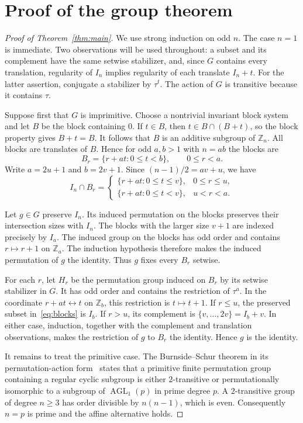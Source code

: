 \documentclass[11pt]{article}
\newcommand{\Z}{\mathbb Z}
\newcommand{\AGL}{\operatorname{AGL}}
\begin{document}
\section{Proof of the group theorem}
\begin{proof}[Proof of Theorem~\ref{thm:main}]
We use strong induction on odd $n$. The case $n=1$ is immediate.
Two observations will be used throughout: a subset and its complement
have the same setwise stabilizer, and, since $G$ contains every
translation, regularity of $I_n$ implies regularity of each translate
$I_n+t$. For the latter assertion, conjugate a stabilizer by $\tau^t$.
The action of $G$ is transitive because it contains $\tau$.

Suppose first that $G$ is imprimitive. Choose a nontrivial invariant
block system and let $B$ be the block containing $0$. If $t\in B$,
then $t\in B\cap(B+t)$, so the block property gives $B+t=B$.
It follows that $B$ is an additive subgroup of $\Z_n$. All blocks
are translates of $B$. Hence for odd $a,b>1$ with $n=ab$ the blocks are
\[
 B_r=\{r+at:0\leq t<b\},\qquad 0\leq r<a.
\]
Write $a=2u+1$ and $b=2v+1$. Since $(n-1)/2=av+u$, we have
\begin{equation}\label{eq:blocks}
 I_n\cap B_r=
 \begin{cases}
 \{r+at:0\leq t\leq v\},&0\leq r\leq u,\\
 \{r+at:0\leq t<v\},&u<r<a.
 \end{cases}
\end{equation}

Let $g\in G$ preserve $I_n$. Its induced permutation on the blocks
preserves their intersection sizes with $I_n$. The blocks with the
larger size $v+1$ are indexed precisely by $I_a$. The induced group
on the blocks has odd order and contains $r\mapsto r+1$ on $\Z_a$.
The induction hypothesis therefore makes the induced permutation of
$g$ the identity. Thus $g$ fixes every $B_r$ setwise.

For each $r$, let $H_r$ be the permutation group induced on $B_r$ by
its setwise stabilizer in $G$. It has odd order and contains the
restriction of $\tau^a$. In the coordinate $r+at\leftrightarrow t$
on $\Z_b$, this restriction is $t\mapsto t+1$. If $r\leq u$, the
preserved subset in~\eqref{eq:blocks} is $I_b$. If $r>u$, its
complement is $\{v,\ldots,2v\}=I_b+v$. In either case, induction,
together with the complement and translation observations, makes the
restriction of $g$ to $B_r$ the identity. Hence $g$ is the identity.

It remains to treat the primitive case. The Burnside--Schur theorem
in its permutation-action form~\cite[opening theorem]{EP} states that a primitive
finite permutation group containing a regular cyclic subgroup is
either $2$-transitive or permutationally isomorphic to a subgroup of
$\AGL_1(p)$ in prime degree $p$. A $2$-transitive group of degree
$n\geq3$ has order divisible by $n(n-1)$, which is even. Consequently
$n=p$ is prime and the affine alternative holds.


\end{proof}
\end{document}
